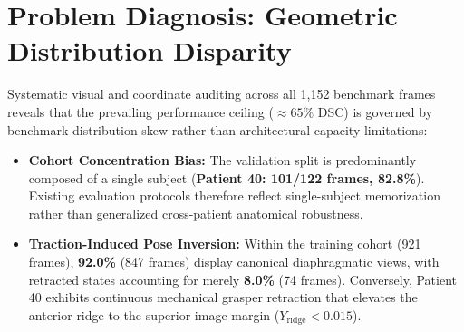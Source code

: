 \documentclass[10pt]{article}
\begin{document}
\begin{table}[!ht]
\centering
\caption{Benchmark Comparison on Canonical L3D Benchmark.}
\label{tab:sota}
\footnotesize
\setlength{\tabcolsep}{4.5pt}
\end{table}

\section{Problem Diagnosis: Geometric Distribution Disparity}
Systematic visual and coordinate auditing across all 1,152 benchmark frames reveals that the prevailing performance ceiling ($\approx 65\%$ DSC) is governed by benchmark distribution skew rather than architectural capacity limitations:
\begin{itemize}
    \item \textbf{Cohort Concentration Bias:}
    The validation split is predominantly composed of a single subject (\textbf{Patient 40: 101/122 frames, 82.8\%}). Existing evaluation protocols therefore reflect single-subject memorization rather than generalized cross-patient anatomical robustness.
    \item \textbf{Traction-Induced Pose Inversion:}
    Within the training cohort (921 frames), \textbf{92.0\%} (847 frames) display canonical diaphragmatic views, with retracted states accounting for merely \textbf{8.0\%} (74 frames). Conversely, Patient 40 exhibits continuous mechanical grasper retraction that elevates the anterior ridge to the superior image margin ($Y_{\text{ridge}} < 0.015$).
\end{itemize}
\end{document}
